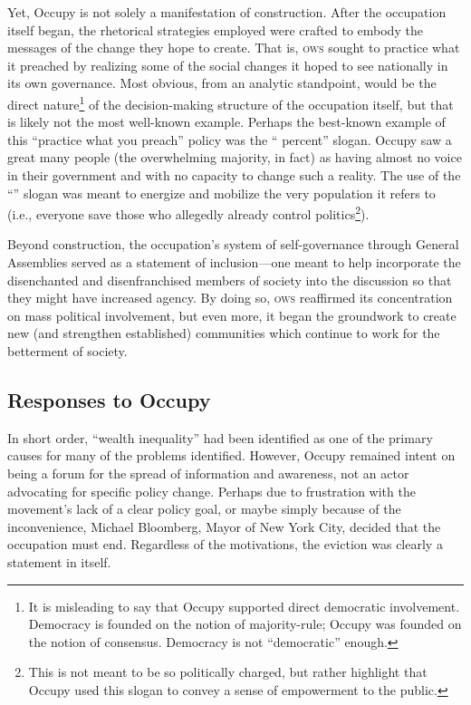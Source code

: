 \documentclass[openany,twoside]{memoir}
\begin{document}
\begin{Spacing}{2}
Yet, Occupy is not solely a manifestation of construction.
After the occupation itself began, the rhetorical strategies employed were crafted to embody the messages of the change they hope to create.
That is, \textsc{ows} sought to practice what it preached by realizing some of the social changes it hoped to see nationally in its own governance.
Most obvious, from an analytic standpoint, would be the direct nature\footnote{
It is misleading to say that Occupy supported direct democratic involvement. 
Democracy is founded on the notion of majority-rule; Occupy was founded on the notion of consensus. 
Democracy is not ``democratic'' enough.} 
of the decision-making structure of the occupation itself, but that is likely not the most well-known example.
Perhaps the best-known example of this ``practice what you preach'' policy was the `` percent'' slogan.
Occupy saw a great many people (the overwhelming majority, in fact) as having almost no voice in their government and with no capacity to change such a reality.
The use of the ``'' slogan was meant to energize and mobilize the very population it refers to (i.e., everyone save those who allegedly already control politics\footnote{
This is not meant to be so politically charged, but rather highlight that Occupy used this slogan to convey a sense of empowerment to the public.}).

Beyond construction, the occupation's system of self-governance through General Assemblies served as a statement of inclusion---one meant to help incorporate the disenchanted and disenfranchised members of society into the discussion so that they might have increased agency.
By doing so, \textsc{ows} reaffirmed its concentration on mass political involvement, but even more, it began the groundwork to create new (and strengthen established) communities which continue to work for the betterment of society.

\subsection{Responses to Occupy}
In short order, ``wealth inequality'' had been identified as one of the primary causes for many of the problems identified.
However, Occupy remained intent on being a forum for the spread of information and awareness, not an actor advocating for specific policy change.
Perhaps due to frustration with the movement's lack of a clear policy goal, or maybe simply because of the inconvenience, Michael Bloomberg, Mayor of New York City, decided that the occupation must end.
Regardless of the motivations, the eviction was clearly a statement in itself.


\end{Spacing}
\end{document}
